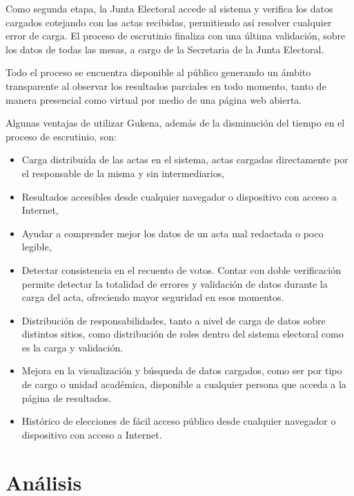 Como segunda etapa, la Junta Electoral accede al sistema y verifica los datos cargados cotejando con las actas recibidas, permitiendo así resolver cualquier error de carga. 
El proceso de escrutinio finaliza con una última validación, sobre los datos de todas las mesas, a cargo de la Secretaria de la Junta Electoral. 

Todo el proceso se encuentra disponible al público generando un ámbito transparente al observar los resultados parciales en todo momento, tanto de manera presencial como virtual por medio de una página web abierta.

Algunas ventajas de utilizar Gukena, además de la disminución del tiempo en el proceso de escrutinio, son:
\begin{itemize}
\item Carga distribuida de las actas en el sistema, actas cargadas directamente por el responsable de la misma y sin intermediarios,
\item Resultados accesibles desde cualquier navegador o dispositivo con acceso a Internet,
\item Ayudar a comprender mejor los datos de un acta mal redactada o poco legible,
\item Detectar consistencia en el recuento de votos. Contar con doble verificación permite detectar la totalidad de errores y validación de datos durante la carga del acta, ofreciendo mayor seguridad en esos momentos. 
\item Distribución de responsabilidades, tanto a nivel de carga de datos sobre distintos sitios, como distribución de roles dentro del sistema electoral como es la carga y validación.
\item Mejora en la visualización y búsqueda de datos cargados, como ser por tipo de cargo o unidad académica, disponible a cualquier persona que acceda a la página de resultados.
\item Histórico de elecciones de fácil acceso público desde cualquier navegador o dispositivo con acceso a Internet.

\end{itemize}

\section{Análisis}
